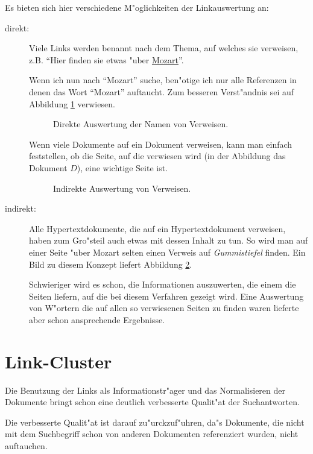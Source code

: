 Es bieten sich hier verschiedene M"oglichkeiten der Linkauswertung an:
\begin{description}
	\item[direkt:]	Viele Links werden benannt nach dem Thema, auf welches sie verweisen, z.B. "`Hier finden sie etwas "uber \underline{Mozart}"'. 
	
	Wenn ich nun nach "`Mozart"' suche, ben"otige ich nur alle Referenzen in denen das Wort "`Mozart"' auftaucht. Zum besseren Verst"andnis sei auf Abbildung \ref{LinksErsteSeite} verwiesen.

\begin{figure}[p]
	\caption{Direkte Auswertung der Namen von Verweisen.}
	\label{LinksErsteSeite}
\end{figure}

	Wenn viele Dokumente auf ein Dokument verweisen, kann man einfach feststellen, ob die Seite, auf die verwiesen wird (in der Abbildung das Dokument $D$), eine wichtige Seite ist. 

\begin{figure}[p]
	\caption{Indirekte Auswertung von Verweisen.}
	\label{LinksZweiteSeite}
\end{figure}

	\item[indirekt:]	Alle Hypertextdokumente, die auf ein Hypertextdokument verweisen, haben zum Gro"steil auch etwas mit dessen Inhalt zu tun. So wird man auf einer Seite "uber Mozart selten einen Verweis auf {\em Gummistiefel } finden. Ein Bild zu diesem Konzept liefert Abbildung \ref{LinksZweiteSeite}.
	
	Schwieriger wird es schon, die Informationen auszuwerten, die einem die Seiten liefern, auf die bei diesem Verfahren gezeigt wird. Eine Auswertung von W"ortern die auf allen so verwiesenen Seiten zu finden waren lieferte aber schon ansprechende Ergebnisse.		
\end{description}


\section{Link-Cluster}
Die Benutzung der Links als Informationstr"ager und das Normalisieren der Dokumente bringt schon eine deutlich verbesserte Qualit"at der Suchantworten.

Die verbesserte Qualit"at ist darauf zu"urckzuf"uhren, da"s Dokumente, die nicht mit dem Suchbegriff schon von anderen Dokumenten referenziert wurden, nicht auftauchen.

